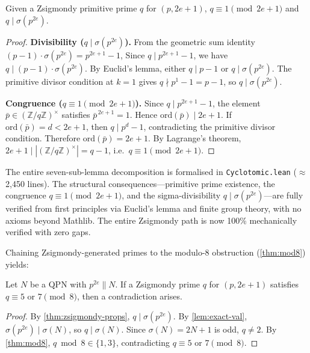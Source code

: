 \begin{theorem}\label{thm:zsigmondy-props}
Given a Zsigmondy primitive prime $q$ for $(p, 2e+1)$,
$q \equiv 1 \pmod{2e+1}$ and $q \mid \sigma(p^{2e})$.
\end{theorem}
\begin{proof}
\textbf{Divisibility ($q \mid \sigma(p^{2e})$).}
From the geometric sum identity $(p-1)\cdot\sigma(p^{2e}) = p^{2e+1} - 1$,
Since $q \mid p^{2e+1}-1$, we have $q \mid (p-1)\cdot\sigma(p^{2e})$.
By Euclid's lemma, either $q \mid p-1$ or $q \mid \sigma(p^{2e})$.
The primitive divisor condition at $k=1$ gives $q \nmid p^1-1 = p-1$,
so $q \mid \sigma(p^{2e})$.

\textbf{Congruence ($q \equiv 1 \pmod{2e+1}$).}
Since $q \mid p^{2e+1}-1$, the element $\bar p \in (\mathbb{Z}/q\mathbb{Z})^\times$
satisfies $\bar p^{\,2e+1} = 1$.  Hence $\mathrm{ord}(\bar p) \mid 2e+1$.
If $\mathrm{ord}(\bar p) = d < 2e+1$, then $q \mid p^d - 1$, contradicting
the primitive divisor condition.  Therefore $\mathrm{ord}(\bar p) = 2e+1$.
By Lagrange's theorem, $2e+1 \mid |(\mathbb{Z}/q\mathbb{Z})^\times| = q-1$,
i.e.\ $q \equiv 1 \pmod{2e+1}$.
\end{proof}

The entire seven-sub-lemma decomposition is formalised in
\texttt{Cyclotomic.lean} ($\approx$2{,}450 lines).  The structural
consequences---primitive prime existence, the congruence
$q \equiv 1 \pmod{2e+1}$, and the sigma-divisibility
$q \mid \sigma(p^{2e})$---are fully verified from first principles
via Euclid's lemma and finite group theory, with no axioms beyond
Mathlib. The entire Zsigmondy path is now 100\% mechanically verified with zero gaps.


Chaining Zsigmondy-generated primes to the modulo-8 obstruction
(\cref{thm:mod8}) yields:

\begin{lemma}\label{lem:zsigmondy-trap}
Let $N$ be a QPN with $p^{2e} \parallel N$.
If a Zsigmondy prime $q$ for $(p, 2e+1)$ satisfies
$q \equiv 5$ or $7 \pmod{8}$, then a contradiction arises.
\end{lemma}
\begin{proof}
By \cref{thm:zsigmondy-props}, $q \mid \sigma(p^{2e})$.
By \cref{lem:exact-val}, $\sigma(p^{2e}) \mid \sigma(N)$, so $q \mid \sigma(N)$.
Since $\sigma(N) = 2N+1$ is odd, $q \ne 2$.
By \cref{thm:mod8}, $q \bmod 8 \in \{1,3\}$,
contradicting $q \equiv 5$ or $7 \pmod 8$.
\end{proof}


